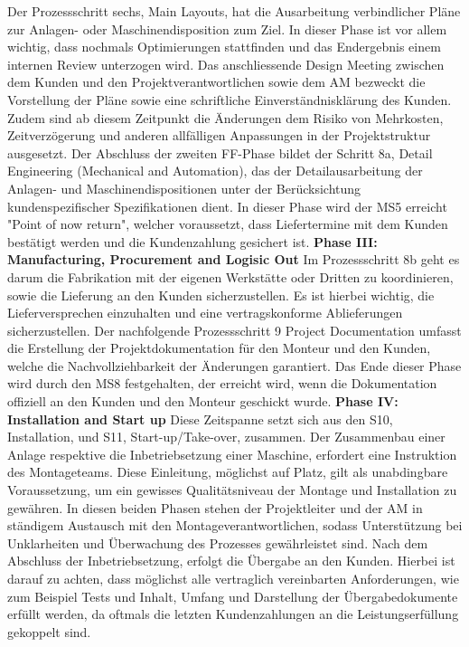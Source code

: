 Der Prozessschritt sechs, Main Layouts, hat die Ausarbeitung verbindlicher Pläne zur Anlagen- oder Maschinendisposition zum Ziel. In dieser Phase ist vor allem wichtig, dass nochmals Optimierungen stattfinden und das Endergebnis einem internen Review unterzogen wird. Das anschliessende Design Meeting zwischen dem Kunden und den Projektverantwortlichen sowie dem AM bezweckt die Vorstellung der Pläne sowie eine schriftliche Einverständnisklärung des Kunden. Zudem sind ab diesem Zeitpunkt die Änderungen dem Risiko von Mehrkosten, Zeitverzögerung und anderen allfälligen Anpassungen in der Projektstruktur ausgesetzt. Der Abschluss der zweiten FF-Phase bildet der Schritt 8a, Detail Engineering (Mechanical and Automation), das der Detailausarbeitung der Anlagen- und Maschinendispositionen unter der Berücksichtung kundenspezifischer Spezifikationen dient. In dieser Phase wird der MS5 erreicht "Point of now return", welcher voraussetzt, dass Liefertermine mit dem Kunden bestätigt werden und die Kundenzahlung gesichert ist. 
\newline
\textbf{Phase III: Manufacturing, Procurement and Logisic Out}
\newline
Im Prozessschritt 8b geht es darum die Fabrikation mit der eigenen Werkstätte oder Dritten zu koordinieren, sowie die Lieferung an den Kunden sicherzustellen. Es ist hierbei wichtig, die Lieferversprechen einzuhalten und eine vertragskonforme Ablieferungen sicherzustellen. Der nachfolgende Prozessschritt 9 Project Documentation umfasst die Erstellung der Projektdokumentation für den Monteur und den Kunden, welche die Nachvollziehbarkeit der Änderungen garantiert. Das Ende dieser Phase wird durch den MS8 festgehalten, der erreicht wird, wenn die Dokumentation offiziell an den Kunden und den Monteur geschickt wurde. 
\newline
\textbf{Phase IV: Installation and Start up}
\newline
Diese Zeitspanne setzt sich aus den S10, Installation, und S11, Start-up/Take-over, zusammen. Der Zusammenbau einer Anlage respektive die Inbetriebsetzung einer Maschine, erfordert eine Instruktion des Montageteams. Diese Einleitung, möglichst auf Platz, gilt als unabdingbare Voraussetzung, um ein gewisses Qualitätsniveau der Montage und Installation zu gewähren. In diesen beiden Phasen stehen der Projektleiter und der AM in ständigem Austausch mit den Montageverantwortlichen, sodass Unterstützung bei Unklarheiten und Überwachung des Prozesses gewährleistet sind. Nach dem Abschluss der Inbetriebsetzung, erfolgt die Übergabe an den Kunden. Hierbei ist darauf zu achten, dass möglichst alle vertraglich vereinbarten Anforderungen, wie zum Beispiel Tests und Inhalt, Umfang und Darstellung der Übergabedokumente erfüllt werden, da oftmals die letzten Kundenzahlungen an die Leistungserfüllung gekoppelt sind. 
